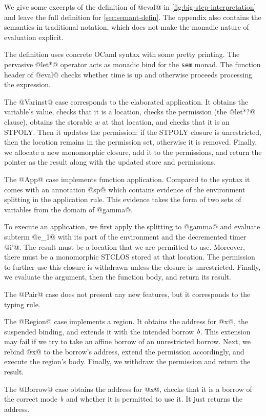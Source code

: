 
 
We give some excerpts of the definition of @eval@ in
\cref{fig:big-step-interpretation} and leave the full 
definition for \cref{sec:semant-defin}. The appendix also
contains the semantics 
in traditional notation, which does not make the monadic nature of
evaluation explicit.

The definition uses concrete OCaml syntax with some pretty
printing. The pervasive @let*@ operator acts as monadic bind
for the \lstinline/sem/ monad. The function header of @eval@ checks
whether time is up and otherwise proceeds processing the expression.

The @Varinst@ case corresponds to the elaborated application. It
obtains the variable's value, checks that it is a location, checks the
permission (the @let*?@ clause), obtains the storable $w$ at that
location, and checks that it is an STPOLY. Then it updates the
permission: if the STPOLY closure is unrestricted, then the location
remains in the permission set, otherwise it is removed. Finally, we
allocate a new monomorphic closure, add it to the permissions, and
return the pointer as the result along with the updated store and
permissions.

The @App@ case implements function application. Compared to the syntax
it comes with an annotation @sp@ which contains evidence of the
environment splitting in the application rule. This evidence takes the
form of two sets of variables from the domain of @gamma@.

To execute an application, we first apply the splitting to @gamma@ and
evaluate subterm @e_1@ with its part of the environment and the
decremented timer @i'@. The result must be a location that we are
permitted to use. Moreover, there must be a monomorphic STCLOS stored
at that location. The permission to further use this closure is
withdrawn unless the closure is unrestricted. Finally, we evaluate the
argument, then the function body, and return its result.

The @Pair@ case does not present any new features, but it
corresponds to the  typing rule.

The @Region@ case implements a region. It obtains the address for @x@,
the suspended binding, and extends it with the intended borrow
$\textit{b}$. This extension may fail if we try to take an affine borrow
of an unrestricted borrow. Next, we rebind @x@ to the borrow's
address, extend the permission accordingly, and execute the region's
body.  Finally, we withdraw the permission and return the result.

The @Borrow@ case obtains the address for @x@, checks that it is a
borrow of the correct mode $\textit{b}$ and whether it is permitted to
use it. It just returns the address.

\lstDeleteShortInline@

